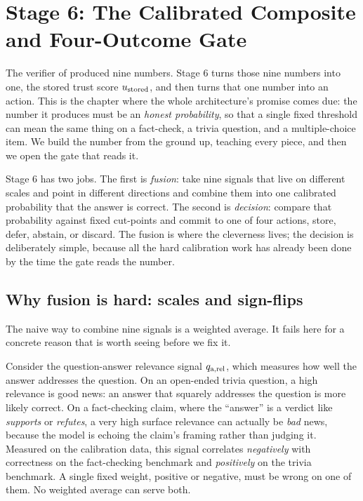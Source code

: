 \chapter{Stage 6: The Calibrated Composite and Four-Outcome Gate}
\label{ch:composite}

The verifier of  produced nine numbers. Stage 6 turns those nine
numbers into one, the stored trust score $u_{\text{stored}}$, and then turns that one number
into an action. This is the chapter where the whole architecture's promise comes
due: the number it produces must be an \emph{honest probability}, so that a single
fixed threshold can mean the same thing on a fact-check, a trivia question, and a
multiple-choice item. We build the number from the ground up, teaching every piece,
and then we open the gate that reads it.

\begin{intuition}
Stage 6 has two jobs. The first is \emph{fusion}: take nine signals that live on
different scales and point in different directions and combine them into one
calibrated probability that the answer is correct. The second is \emph{decision}:
compare that probability against fixed cut-points and commit to one of four actions,
store, defer, abstain, or discard. The fusion is where the cleverness lives; the
decision is deliberately simple, because all the hard calibration work has already
been done by the time the gate reads the number.
\end{intuition}

\section{Why fusion is hard: scales and sign-flips}
\label{sec:composite-problem}

The naive way to combine nine signals is a weighted average. It fails here for a
concrete reason that is worth seeing before we fix it.

\begin{intuition}
Consider the question-answer relevance signal $q_{\text{a,rel}}$, which measures how well the
answer addresses the question. On an open-ended trivia question, a high relevance is
good news: an answer that squarely addresses the question is more likely correct. On
a fact-checking claim, where the ``answer'' is a verdict like \emph{supports} or
\emph{refutes}, a very high surface relevance can actually be \emph{bad} news,
because the model is echoing the claim's framing rather than judging it. Measured on
the calibration data, this signal correlates \emph{negatively} with correctness on
the fact-checking benchmark and \emph{positively} on the trivia benchmark. A single
fixed weight, positive or negative, must be wrong on one of them. No weighted
average can serve both.
\end{intuition}

